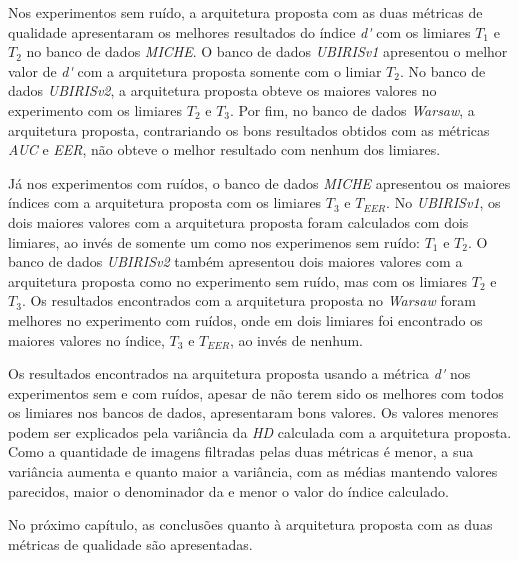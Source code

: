 \par Nos experimentos sem ruído, a arquitetura proposta com as duas métricas de qualidade apresentaram os melhores resultados do índice \textit{\acrshort{d'}} com os limiares $T_{1}$ e $T_{2}$ no banco de dados \textit{MICHE}. O banco de dados \textit{UBIRISv1} apresentou o melhor valor de \textit{\acrshort{d'}} com a arquitetura proposta somente com o limiar $T_{2}$. No banco de dados \textit{UBIRISv2}, a arquitetura proposta obteve os maiores valores no experimento com os limiares $T_{2}$ e $T_{3}$. Por fim, no banco de dados \textit{\acrshort{Warsaw}}, a arquitetura proposta, contrariando os bons resultados obtidos com as métricas \textit{\acrshort{AUC}} e \textit{\acrshort{EER}}, não obteve o melhor resultado com nenhum dos limiares.

\par Já nos experimentos com ruídos, o banco de dados \textit{MICHE} apresentou os maiores índices com a arquitetura proposta com os limiares $T_{3}$ e $T_{EER}$. No \textit{UBIRISv1}, os dois maiores valores com a arquitetura proposta foram calculados com dois limiares, ao invés de somente um como nos experimenos sem ruído: $T_{1}$ e $T_{2}$. O banco de dados \textit{UBIRISv2} também apresentou dois maiores valores com a arquitetura proposta como no experimento sem ruído, mas com os limiares $T_{2}$ e $T_{3}$. Os resultados encontrados com a arquitetura proposta no \textit{\acrshort{Warsaw}} foram melhores no experimento com ruídos, onde em dois limiares foi encontrado os maiores valores no índice, $T_{3}$ e $T_{EER}$, ao invés de nenhum.

\par Os resultados encontrados na arquitetura proposta usando a métrica \textit{\acrshort{d'}} nos experimentos sem e com ruídos, apesar de não terem sido os melhores com todos os limiares nos bancos de dados, apresentaram bons valores. Os valores menores podem ser explicados pela variância da \textit{\acrshort{HD}} calculada com a arquitetura proposta. Como a quantidade de imagens filtradas pelas duas métricas é menor, a sua variância aumenta e quanto maior a variância, com as médias mantendo valores parecidos, maior o denominador da  e menor o valor do índice calculado.

\par No próximo capítulo, as conclusões quanto à arquitetura proposta com as duas métricas de qualidade  são apresentadas.
